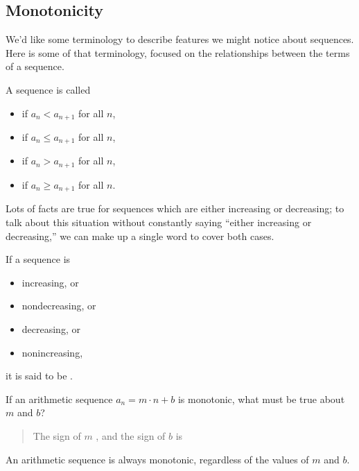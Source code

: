 \documentclass{ximera}
\begin{document}
\subsection{Monotonicity}

We'd like some terminology to describe features we might
notice about sequences.  Here is some of that terminology, focused on the relationships between the terms of a sequence.

\begin{definition}
  A sequence is called
  \begin{itemize}
    \item {} if $a_n<a_{n+1}$ for all $n$,
    \item {} if $a_n\le a_{n+1}$ for all $n$,
    \item {} if $a_n>a_{n+1}$ for all $n$,
    \item {} if $a_n\ge a_{n+1}$ for all $n$.
  \end{itemize}
\end{definition}

Lots of facts are true for sequences which are either increasing or
decreasing; to talk about this situation without constantly saying
``either increasing or decreasing,'' we can make up a single word to
cover both cases.
\begin{definition}
  If a sequence is
  \begin{itemize}
  \item increasing, or
  \item nondecreasing, or
  \item decreasing, or
  \item nonincreasing,
  \end{itemize}
  it is said to be .
\end{definition}

\begin{question}
  If an arithmetic sequence $a_n = m\cdot n + b$ is monotonic, what
  must be true about $m$ and $b$?
  \begin{prompt}
    \begin{quote}
      The sign of $m$ , and the sign of $b$ is
    \end{quote}
  \end{prompt}
  \begin{feedback}
    An arithmetic sequence is always monotonic, regardless of the
    values of $m$ and $b$.
  \end{feedback}
\end{question}
\end{document}
